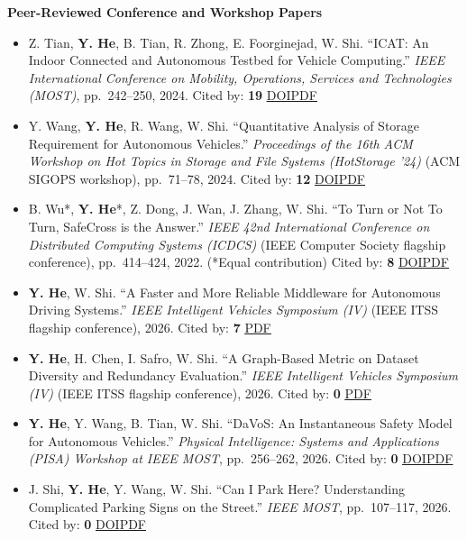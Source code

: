 \documentclass[11pt]{article}
\let\cvplainhref\href
\renewcommand{\href}[2]{\cvplainhref{#1}{\uline{#2}}}
\newcommand{\cvsubsection}[1]{%
  \Needspace{3\baselineskip}%
  \vspace{0.32em}%
  {\bfseries #1}\par
  \vspace{0.12em}
}
\newcommand{\pubcitation}[1]{%
  \unskip\nobreakspace Cited by: \textbf{#1}%
}
\newcommand{\pubaccepted}[2]{%
  \pubcitation{#1}\nobreakspace\href{#2}{PDF}%
}
\newcommand{\pubaccepteddoi}[3]{%
  \pubcitation{#1}\nobreakspace\href{#2}{DOI}\nobreakspace\href{#3}{PDF}%
}
\begin{document}
\cvsubsection{Peer-Reviewed Conference and Workshop Papers}
\begin{itemize}
    \item Z. Tian, \textbf{Y. He}, B. Tian, R. Zhong, E. Foorginejad, W. Shi. ``ICAT: An Indoor Connected and Autonomous Testbed for Vehicle Computing.'' \textit{IEEE International Conference on Mobility, Operations, Services and Technologies (MOST)}, pp.\ 242--250, 2024.\pubaccepteddoi{19}{https://doi.org/10.1109/MOST60774.2024.00033}{https://weisongshi.org/papers/Tian24-ICAT.pdf}
    \item Y. Wang, \textbf{Y. He}, R. Wang, W. Shi. ``Quantitative Analysis of Storage Requirement for Autonomous Vehicles.'' \textit{Proceedings of the 16th ACM Workshop on Hot Topics in Storage and File Systems (HotStorage '24)} (ACM SIGOPS workshop), pp.\ 71--78, 2024.\pubaccepteddoi{12}{https://doi.org/10.1145/3655038.3665948}{https://weisongshi.org/papers/Wang24-HotStorage.pdf}
    \item B. Wu*, \textbf{Y. He}*, Z. Dong, J. Wan, J. Zhang, W. Shi. ``To Turn or Not To Turn, SafeCross is the Answer.'' \textit{IEEE 42nd International Conference on Distributed Computing Systems (ICDCS)} (IEEE Computer Society flagship conference), pp.\ 414--424, 2022. (*Equal contribution)\pubaccepteddoi{8}{https://doi.org/10.1109/ICDCS54860.2022.00047}{https://weisongshi.org/papers/wu22-SafeCross.pdf}
    \item \textbf{Y. He}, W. Shi. ``A Faster and More Reliable Middleware for Autonomous Driving Systems.'' \textit{IEEE Intelligent Vehicles Symposium (IV)} (IEEE ITSS flagship conference), 2026.\pubaccepted{7}{https://weisongshi.org/papers/he26-sim.pdf}
    \item \textbf{Y. He}, H. Chen, I. Safro, W. Shi. ``A Graph-Based Metric on Dataset Diversity and Redundancy Evaluation.'' \textit{IEEE Intelligent Vehicles Symposium (IV)} (IEEE ITSS flagship conference), 2026.\pubaccepted{0}{https://weisongshi.org/papers/he26-udrive.pdf}
    \item \textbf{Y. He}, Y. Wang, B. Tian, W. Shi. ``DaVoS: An Instantaneous Safety Model for Autonomous Vehicles.'' \textit{Physical Intelligence: Systems and Applications (PISA) Workshop at IEEE MOST}, pp.\ 256--262, 2026.\pubaccepteddoi{0}{https://doi.org/10.1109/MOST69733.2026.00043}{https://weisongshi.org/papers/he26-DaVoS.pdf}
    \item J. Shi, \textbf{Y. He}, Y. Wang, W. Shi. ``Can I Park Here? Understanding Complicated Parking Signs on the Street.'' \textit{IEEE MOST}, pp.\ 107--117, 2026.\pubaccepteddoi{0}{https://doi.org/10.1109/MOST69733.2026.00021}{https://weisongshi.org/papers/shi26-PaRC.pdf}
\end{itemize}
\end{document}
